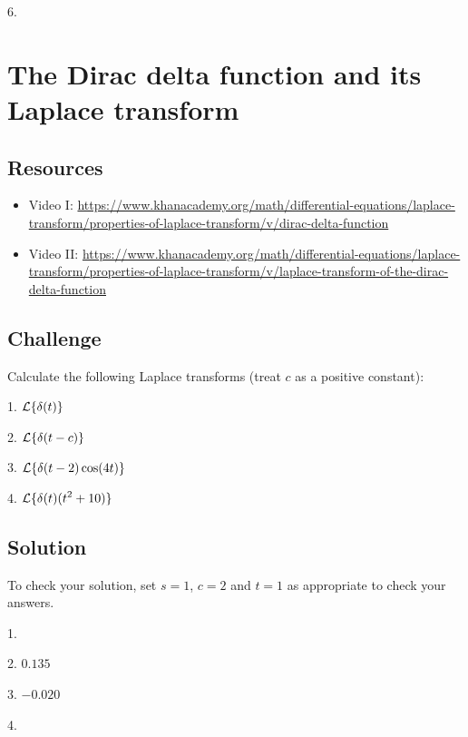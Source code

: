 6.\\



\newpage
\section{The Dirac delta function and its Laplace transform}

\subsection*{Resources}
\begin{itemize}
    \item Video I: \url{https://www.khanacademy.org/math/differential-equations/laplace-transform/properties-of-laplace-transform/v/dirac-delta-function}
    \item Video II: \url{https://www.khanacademy.org/math/differential-equations/laplace-transform/properties-of-laplace-transform/v/laplace-transform-of-the-dirac-delta-function}
\end{itemize}

\subsection*{Challenge}
Calculate the following Laplace transforms (treat $c$ as a positive constant):

1. $\displaystyle \mathcal{L}\{\delta(t)\}$

2. $\displaystyle \mathcal{L}\{\delta(t-c)\}$

3. $\displaystyle \mathcal{L}\{\delta(t-2) \cos(4 t)\}$

4. $\displaystyle \mathcal{L}\{\delta(t) (t^2+10)\}$

\subsection*{Solution}
To check your solution, set $s=1$, $c=2$ and $t=1$ as appropriate to check your answers.

1.\\

2. $0.135$

3. $-0.020$

4.\\




\newpage
